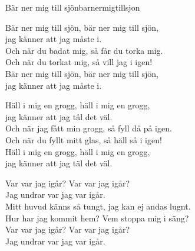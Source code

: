\begin{song}{Bär ner mig till sjön}{barnermigtillsjon}
\begin{vers}
\repopen Bär ner mig till sjön, bär ner mig till sjön, \\
jag känner att jag måste i. \repclose\\
Och när du badat mig, så får du torka mig.\\
Och när du torkat mig, så vill jag i igen!\\
Bär ner mig till sjön, bär ner mig till sjön,\\
jag känner att jag måste i.\\
\end{vers}
\begin{vers}
\repopen Häll i mig en grogg, häll i mig en grogg, \\
jag känner att jag tål det väl. \repclose\\
Och när jag fått min grogg, så fyll då på igen.\\
Och när du fyllt mitt glas, så häll så i igen!\\
Häll i mig en grogg, häll i mig en grogg,\\
jag känner att jag täl det väl.\\
\end{vers}
\begin{vers}
\repopen Var var jag igår? Var var jag igår? \\
Jag undrar var jag var igår. \repclose\\
Mitt huvud känns så tungt, jag kan ej andas lugnt.\\
Hur har jag kommit hem? Vem stoppa mig i säng?\\
Var var jag igår? Var var jag igår?\\
Jag undrar var jag var igår.\\
\end{vers}
\end{song}
